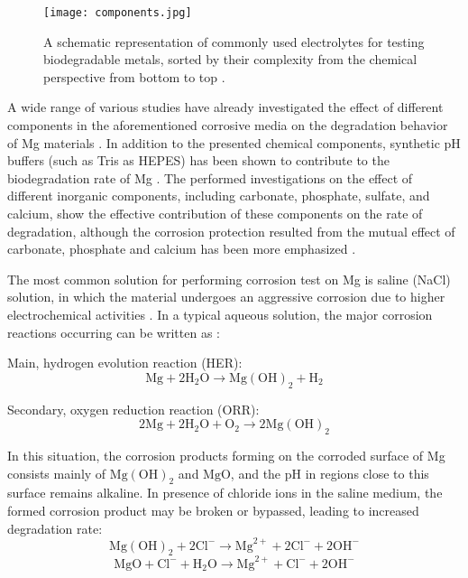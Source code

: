 \begin{figure}
\centering
\medskip
\texttt{[image: components.jpg]}
\caption[Commonly used electrolytes for testing biodegradable metals]{A schematic representation of commonly used electrolytes for testing biodegradable metals, sorted by their complexity from the chemical perspective from bottom to top \cite{Mei2020}.} 
\label{fig:components}
\end{figure}

A wide range of various studies have already investigated the effect of different components in the aforementioned corrosive media on the degradation behavior of Mg materials \cite{Mei2019,Zeng2014,Johnston2017, Lamaka2018,Mei2019a}. In addition to the presented chemical components, synthetic pH buffers (such as Tris as HEPES) has been shown to contribute to the biodegradation rate of Mg \cite{Mei2019}. The performed investigations on the effect of different inorganic components, including carbonate, phosphate, sulfate, and calcium, show the effective contribution of these components on the rate of degradation, although the corrosion protection resulted from the mutual effect of carbonate, phosphate and calcium has been more emphasized \cite{Mei2019,Lamaka2018}.




The most common solution for performing corrosion test on Mg is saline (NaCl) solution, in which the material undergoes an aggressive corrosion due to higher electrochemical activities \cite{Hadzima2014,Lu2019}. In a typical aqueous solution, the major corrosion reactions occurring can be written as \cite{Li2020,Atrens2015}:

Main, hydrogen evolution reaction (HER):
\begin{equation}
\mathrm{Mg}+2 \mathrm{H}_{2} \mathrm{O} \rightarrow \mathrm{Mg}(\mathrm{OH})_{2}+\mathrm{H}_{2} 
\end{equation}

Secondary, oxygen reduction reaction (ORR):
\begin{equation}
2 \mathrm{Mg}+2 \mathrm{H}_{2} \mathrm{O}+\mathrm{O}_{2} \rightarrow 2 \mathrm{Mg}(\mathrm{OH})_{2}
\end{equation}

In this situation, the corrosion products forming on the corroded surface of Mg consists mainly of $\mathrm{Mg}(\mathrm{OH})_{2}$ and $\mathrm{MgO}$, and the pH in regions close to this surface remains alkaline. In presence of chloride ions in the saline medium, the formed corrosion product may be broken or bypassed, leading to increased degradation rate:
\begin{equation} \label{eq:break_react_intro}
\mathrm{Mg}(\mathrm{OH})_{2}+2 \mathrm{Cl}^{-} \rightarrow \mathrm{Mg}^{2+}+2 \mathrm{Cl}^{-}+2 \mathrm{OH}^{-}
\end{equation}
\begin{equation} \label{eq:break_react_mgo_intro}
\mathrm{MgO}+ \mathrm{Cl}^{-} + \mathrm{H}_{2} \mathrm{O} \rightarrow \mathrm{Mg}^{2+}+ \mathrm{Cl}^{-}+ 2\mathrm{OH}^{-}
\end{equation}


